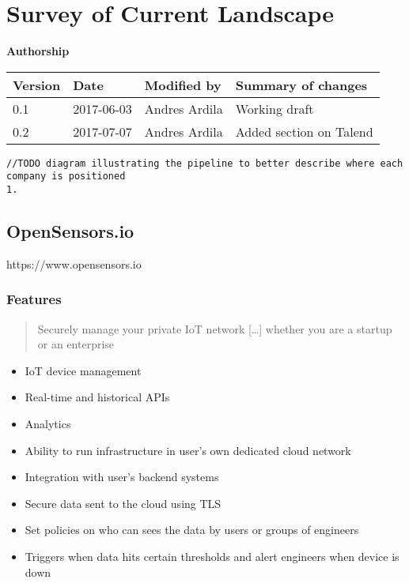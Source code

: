 \section{Survey of Current Landscape}\label{survey-of-current-landscape}

\textbf{Authorship}

\begin{longtable}[]{@{}llll@{}}
\toprule
Version & Date & Modified by & Summary of changes\tabularnewline
\midrule
\endhead
0.1 & 2017-06-03 & Andres Ardila & Working draft\tabularnewline
0.2 & 2017-07-07 & Andres Ardila & Added section on
Talend\tabularnewline
\bottomrule
\end{longtable}

\begin{verbatim}
//TODO diagram illustrating the pipeline to better describe where each company is positioned
1.
\end{verbatim}

\subsection{OpenSensors.io}\label{opensensors.io}

https://www.opensensors.io

\subsubsection{Features}\label{features}

\begin{quote}
Securely manage your private IoT network {[}\ldots{}{]} whether you are
a startup or an enterprise
\end{quote}

\begin{itemize}
\tightlist
\item
  IoT device management
\item
  Real-time and historical APIs
\item
  Analytics
\item
  Ability to run infrastructure in user's own dedicated cloud network
\item
  Integration with user's backend systems
\item
  Secure data sent to the cloud using TLS
\item
  Set policies on who can sees the data by users or groups of engineers
\item
  Triggers when data hits certain thresholds and alert engineers when
  device is down
\end{itemize}

